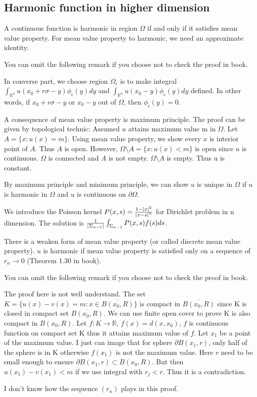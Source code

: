 \subsection{Harmonic function in higher dimension}
A continuous function is harmonic in region $\Omega$ if and only if it satisfies mean value property. For mean value property to harmonic, we need an approximate
identity. \par
You can omit the following remark if you choose not to check the proof in book.
\begin{remark}
    In converse part, we choose region $\Omega_\epsilon$ is to make integral $\int_{\mathbb{R}^n}{u(x_0+r\sigma-y)\phi_\epsilon(y)dy}$ and $\int_{\mathbb{R}^n}{u(x_0-y)\phi_\epsilon(y)dy}$
    defined. In other words, if $x_0+r\sigma-y$ or $x_0-y$ out of $\Omega$, then $\phi_\epsilon(y)=0$.
\end{remark}
A consequence of mean value property is maximum principle. The proof can be given by topological technic: Assumed $u$ attains
maximum value m in $\Omega$. Let $A=\{x:u(x)=m\}$. Using mean value property, we show every $x$ is interior point of $A$. Thus $A$ is open.
However, $\Omega\setminus A=\{x:u(x)<m\}$ is open since $u$ is continuous. $\Omega$ is connected and $A$ is not empty. $\Omega\setminus A$ is empty. Thus u is constant.\par
By maximum principle and minimum principle, we can show $u$ is unique in $\Omega$ if $u$ is harmonic in $\Omega$ and $u$ is continuous on $\partial\Omega$.\par
We introduce the Poisson kernel $P(x,s)=\frac{1-\left\lvert x\right\rvert^2}{\left\lvert x-s\right\rvert^n}$ for Dirichlet problem in n dimension. The solution is
$\frac{1}{\left\lvert\Sigma_{n-1}\right\rvert}\int_{\Sigma_{n-1}}{P(x,s)f(s)ds}$.\par
There is a weaken form of mean value property (or called discrete mean value property). $u$ is harmonic if mean value property is satisfied
only on a sequence of $r_n\to 0$ (Theorem 1.30 in book). \par
You can omit the following remark if you choose not to check the proof in book.
\begin{remark}
    {\color{blue}The proof here is not well understand.} The set $K=\{u(x)-v(x)=m:x\in\overline{B(x_0,R)}\}$ is compact in $\overline{B(x_0,R)}$ since K is closed in compact set $\overline{B(x_0,R)}$. We can use
    finite open cover to prove K is also compact in $B(x_0,R)$. Let $f: K\to\mathbb{R}$, $f(x)=d(x,x_0)$, $f$ is continuous function on compact set
    K thus it attains maximum value of $f$. Let $x_1$ be a point of the maximum value. {\color{blue}I just can image that for sphere $\partial B(x_1,r)$, only half of
            the sphere is in K otherwise $f(x_1)$ is not the maximum value. Here $r$ need to be small enough to ensure $\partial B(x_1,r)\subset B(x_0,R)$}. But then $u(x_1)-v(x_1)<m$ if we use integral with $r_j<r$. Thus it is a contradiction. \par
    {\color{blue} I don't know
        how the sequence $(r_n)$ plays in this proof}.\par
\end{remark}
